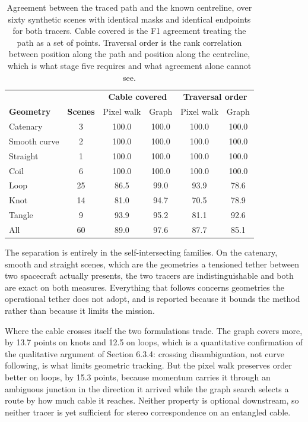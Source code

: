\begin{table}[!ht]
\centering
\caption[Path-tracing agreement with ground truth by geometric family]{Agreement between the traced path and the known centreline, over sixty synthetic scenes with identical masks and identical endpoints for both tracers. Cable covered is the F1 agreement treating the path as a set of points. Traversal order is the rank correlation between position along the path and position along the centreline, which is what stage five requires and what agreement alone cannot see.}
\label{tab:tracer-comparison}
\begin{tabular}{lccccc}
\hline
 & & \multicolumn{2}{c}{\textbf{Cable covered}} & \multicolumn{2}{c}{\textbf{Traversal order}} \\
\textbf{Geometry} & \textbf{Scenes} & Pixel walk & Graph & Pixel walk & Graph \\
\hline
Catenary & 3 & 100.0 & 100.0 & 100.0 & 100.0 \\
Smooth curve & 2 & 100.0 & 100.0 & 100.0 & 100.0 \\
Straight & 1 & 100.0 & 100.0 & 100.0 & 100.0 \\
Coil & 6 & 100.0 & 100.0 & 100.0 & 100.0 \\
Loop & 25 & 86.5 & 99.0 & 93.9 & 78.6 \\
Knot & 14 & 81.0 & 94.7 & 70.5 & 78.9 \\
Tangle & 9 & 93.9 & 95.2 & 81.1 & 92.6 \\
\hline
All & 60 & 89.0 & 97.6 & 87.7 & 85.1 \\
\hline
\end{tabular}
\end{table}

The separation is entirely in the self-intersecting families. On the catenary, smooth and straight scenes, which are the geometries a tensioned tether between two spacecraft actually presents, the two tracers are indistinguishable and both are exact on both measures. Everything that follows concerns geometries the operational tether does not adopt, and is reported because it bounds the method rather than because it limits the mission.

Where the cable crosses itself the two formulations trade. The graph covers more, by 13.7 points on knots and 12.5 on loops, which is a quantitative confirmation of the qualitative argument of Section 6.3.4: crossing disambiguation, not curve following, is what limits geometric tracking. But the pixel walk preserves order better on loops, by 15.3 points, because momentum carries it through an ambiguous junction in the direction it arrived while the graph search selects a route by how much cable it reaches. Neither property is optional downstream, so neither tracer is yet sufficient for stereo correspondence on an entangled cable.

